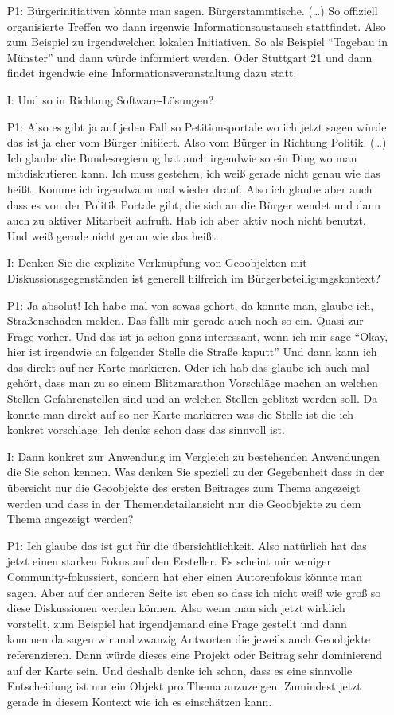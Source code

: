 \begin{itemize}
    \item[P1:] B{\"u}rgerinitiativen k{\"o}nnte man sagen. B{\"u}rgerstammtische. (\dots) So offiziell organisierte Treffen wo dann irgenwie Informationsaustausch stattfindet. Also zum Beispiel zu irgendwelchen lokalen Initiativen. So als Beispiel "`Tagebau in M{\"u}nster"' und dann w{\"u}rde informiert werden. Oder Stuttgart 21 und dann findet irgendwie eine Informationsveranstaltung dazu statt. 
    \item[I:] Und so in Richtung Software-L{\"o}sungen?
    \item[P1:] Also es gibt ja auf jeden Fall so Petitionsportale wo ich jetzt sagen w{\"u}rde das ist ja eher vom B{\"u}rger initiiert. Also vom B{\"u}rger in Richtung Politik. (\dots) Ich glaube die Bundesregierung hat auch irgendwie so ein Ding wo man mitdiskutieren kann. Ich muss gestehen, ich wei{\ss} gerade nicht genau wie das hei{\ss}t. Komme ich irgendwann mal wieder drauf. Also ich glaube aber auch dass es von der Politik Portale gibt, die sich an die B{\"u}rger wendet und dann auch zu aktiver Mitarbeit aufruft. Hab ich aber aktiv noch nicht benutzt. Und wei{\ss} gerade nicht genau wie das hei{\ss}t. 
    \item[I:] Denken Sie die explizite Verkn{\"u}pfung von Geoobjekten mit Diskussionsgegenst{\"a}nden ist generell hilfreich im B{\"u}rgerbeteiligungskontext?
    \item[P1:] Ja absolut! Ich habe mal von sowas geh{\"o}rt, da konnte man, glaube ich, Stra{\ss}ensch{\"a}den melden. Das f{\"a}llt mir gerade auch noch so ein. Quasi zur Frage vorher. Und das ist ja schon ganz interessant, wenn ich mir sage "`Okay, hier ist irgendwie an folgender Stelle die Stra{\ss}e kaputt"' Und dann kann ich das direkt auf ner Karte markieren. Oder ich hab das glaube ich auch mal geh{\"o}rt, dass man zu so einem Blitzmarathon Vorschl{\"a}ge machen an welchen Stellen Gefahrenstellen sind und an welchen Stellen geblitzt werden soll. Da konnte man direkt auf so ner Karte markieren was die Stelle ist die ich konkret vorschlage. Ich denke schon dass das sinnvoll ist. 
    \item[I:] Dann konkret zur Anwendung im Vergleich zu bestehenden Anwendungen die Sie schon kennen. Was denken Sie speziell zu der Gegebenheit dass in der {\"u}bersicht nur die Geoobjekte des ersten Beitrages zum Thema angezeigt werden und dass in der Themendetailansicht nur die Geoobjekte zu dem Thema angezeigt werden?
    \item[P1:] Ich glaube das ist gut f{\"u}r die {\"u}bersichtlichkeit. Also nat{\"u}rlich hat das jetzt einen starken Fokus auf den Ersteller. Es scheint mir weniger Community-fokussiert, sondern hat eher einen Autorenfokus k{\"o}nnte man sagen. Aber auf der anderen Seite ist eben so dass ich nicht wei{\ss} wie gro{\ss} so diese Diskussionen werden k{\"o}nnen. Also wenn man sich jetzt wirklich vorstellt, zum Beispiel hat irgendjemand eine Frage gestellt und dann kommen da sagen wir mal zwanzig Antworten die jeweils auch Geoobjekte referenzieren. Dann w{\"u}rde dieses eine Projekt oder Beitrag sehr dominierend auf der Karte sein. Und deshalb denke ich schon, dass es eine sinnvolle Entscheidung ist nur ein Objekt pro Thema anzuzeigen. Zumindest jetzt gerade in diesem Kontext wie ich es einsch{\"a}tzen kann.

\end{itemize}
